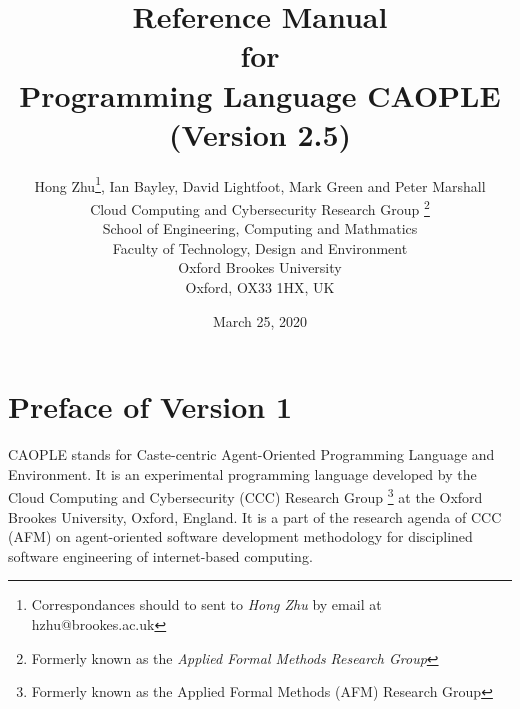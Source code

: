 \documentclass[english]{report}
\begin{document}
\title{Reference Manual \\
for \\
Programming Language CAOPLE\\
{\normalsize (Version 2.5)}
}
\date{March 25, 2020}


\author{Hong Zhu\footnote{Correspondances should to sent to \emph{Hong Zhu} by email at hzhu@brookes.ac.uk}, Ian Bayley, David Lightfoot, Mark Green and Peter Marshall\\
Cloud Computing and Cybersecurity Research Group \footnote{Formerly known as the \emph{Applied Formal Methods Research Group}}\\
School of Engineering, Computing and Mathmatics\\
Faculty of Technology, Design and Environment\\
Oxford Brookes University\\
Oxford, OX33 1HX, UK
}
  
\maketitle

\setcounter{page}{1}

\tableofcontents

\chapter*{Preface of Version 1}

CAOPLE stands for Caste-centric Agent-Oriented Programming Language
and Environment. It is an experimental programming language developed 
by the Cloud Computing and Cybersecurity (CCC) Research Group
\footnote{ Formerly known as the Applied Formal Methods (AFM) Research Group} at the Oxford 
Brookes University, Oxford, England. It is a part of the research agenda of  
CCC (AFM) on agent-oriented software development methodology for disciplined 
software engineering of internet-based computing. 
\end{document}
